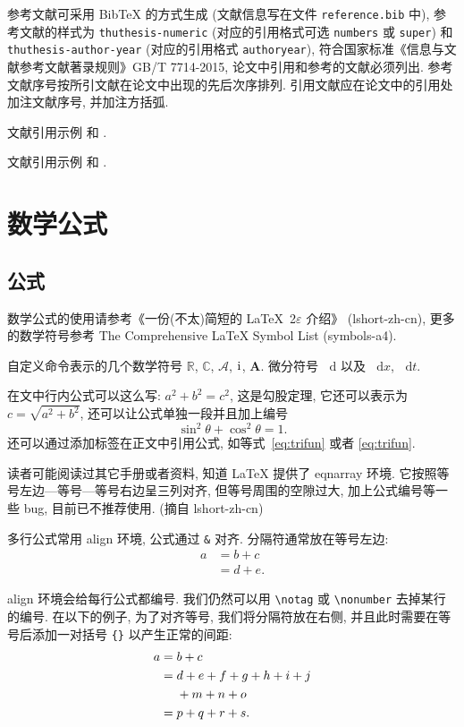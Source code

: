 \documentclass[a4paper,12pt]{article}
\theoremstyle{plain}
\newcommand{\dif}{\mathop{}\!\mathrm{d}}
\newcommand{\CC}{\ensuremath{\mathbb{C}}}
\newcommand{\RR}{\ensuremath{\mathbb{R}}}
\newcommand{\dx}[1][x]{\mathop{}\!\mathrm{d}#1}
\newcommand{\ii}{\mathrm{i}\mkern1mu} %
\newcommand{\A}{\mathcal{A}}
\newcommand{\bA}{\boldsymbol{A}}
\begin{document}
参考文献可采用 BibTeX 的方式生成 (文献信息写在文件 \verb|reference.bib| 中),
参考文献的样式为 \verb|thuthesis-numeric| (对应的引用格式可选 \verb|numbers| 或  \verb|super|)
和 \verb|thuthesis-author-year| (对应的引用格式 \verb|authoryear|),
符合国家标准《信息与文献参考文献著录规则》GB/T 7714-2015, 论文中引用和参考的文献必须列出.
参考文献序号按所引文献在论文中出现的先后次序排列.
引用文献应在论文中的引用处加注文献序号, 并加注方括弧.

文献引用示例 \cite{Tadmor2012} 和 \cite{LiLiu1997,Adams2003,TreWei2014}.

文献引用示例 \cite{LiLiu1997} 和 \cite{Adams2003,Shen1994}.


\section{数学公式}

\subsection{公式}
数学公式的使用请参考《一份(不太)简短的 \LaTeX~2$\varepsilon$ 介绍》 (lshort-zh-cn), 更多的数学符号参考 The Comprehensive LaTeX Symbol List (symbols-a4).

自定义命令表示的几个数学符号 $\RR$, $\CC$, $\A$, $\ii$, $\bA$. 微分符号 $\dif$ 以及 $\dx$, $\dx[t]$.

在文中行内公式可以这么写: $a^2+b^2=c^2$, 这是勾股定理, 它还可以表示为 $c=\sqrt{a^2+b^2}$, 还可以让公式单独一段并且加上编号
\begin{equation}\label{eq:trifun}
\sin^2{\theta}+\cos^2{\theta}=1.
\end{equation}
还可以通过添加标签在正文中引用公式, 如等式~\eqref{eq:trifun} 或者 \ref{eq:trifun}.

读者可能阅读过其它手册或者资料, 知道 LaTeX 提供了 eqnarray 环境. 它按照等号左边—等号—等号右边呈三列对齐, 但等号周围的空隙过大, 加上公式编号等一些 bug, 目前已不推荐使用. (摘自 lshort-zh-cn)

多行公式常用 align 环境, 公式通过 \verb|&| 对齐. 分隔符通常放在等号左边:
\begin{align}
a & = b + c \\
& = d + e.
\end{align}

align 环境会给每行公式都编号. 我们仍然可以用 \verb|\notag| 或 \verb|\nonumber| 去掉某行的编号. 在以下的例子,
为了对齐等号, 我们将分隔符放在右侧, 并且此时需要在等号后添加一对括号 \verb|{}| 以产生正常的间距:
\begin{align}
a ={} & b + c \\
={} & d + e + f + g + h + i + j \notag \\
& + m + n + o \\
={} & p + q + r + s.
\end{align}
\end{document}
